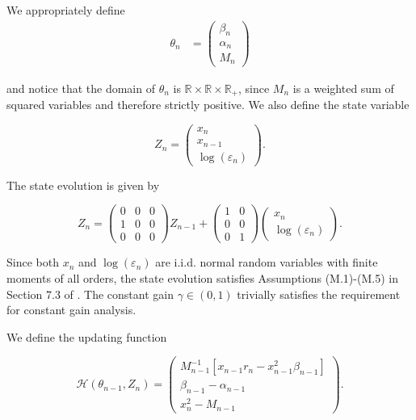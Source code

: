 \documentclass[11pt]{article}
\begin{document}
We appropriately define 
\begin{equation}
\begin{aligned}
\theta_n &= 
\begin{pmatrix}
\beta_n \\
\alpha_n \\
M_n
\end{pmatrix}
\end{aligned}
\end{equation}


and notice that the domain of $\theta_n$ is $\mathbb{R} \times \mathbb{R} \times \mathbb{R}_{+}$, since $M_n$ is a weighted sum of squared variables and therefore strictly positive.
We also define the state variable

\begin{equation}
Z_n =
\begin{pmatrix}
    x_n \\
    x_{n-1} \\
    \log(\varepsilon_n)
\end{pmatrix}.
\end{equation}

The state evolution is given by

\begin{equation}
Z_n =
\begin{pmatrix}
    0 & 0 & 0 \\
    1 & 0 & 0 \\
    0 & 0 & 0
\end{pmatrix}
Z_{n-1}
+
\begin{pmatrix}
    1 & 0 \\
    0 & 0 \\
    0 & 1
\end{pmatrix}
\begin{pmatrix}
    x_n \\
    \log(\varepsilon_n)
\end{pmatrix}.
\end{equation}

Since both $x_n$ and $\log(\varepsilon_n)$ are i.i.d. normal random variables with finite moments of all orders, the state evolution satisfies Assumptions (M.1)-(M.5) in Section 7.3 of \cite{GeorgeWEvans2001}.
The constant gain $\gamma \in (0,1)$ trivially satisfies the requirement for constant gain analysis.

We define the updating function

\begin{equation}
    \mathcal{H}(\theta_{n-1}, Z_n) = 
    \begin{pmatrix}
        M_{n-1}^{-1} \left[ x_{n-1} r_n - x_{n-1}^2 \beta_{n-1} \right] \\
        \beta_{n-1} - \alpha_{n-1} \\
        x_n^2 - M_{n-1}
    \end{pmatrix}.
\end{equation}
\end{document}
